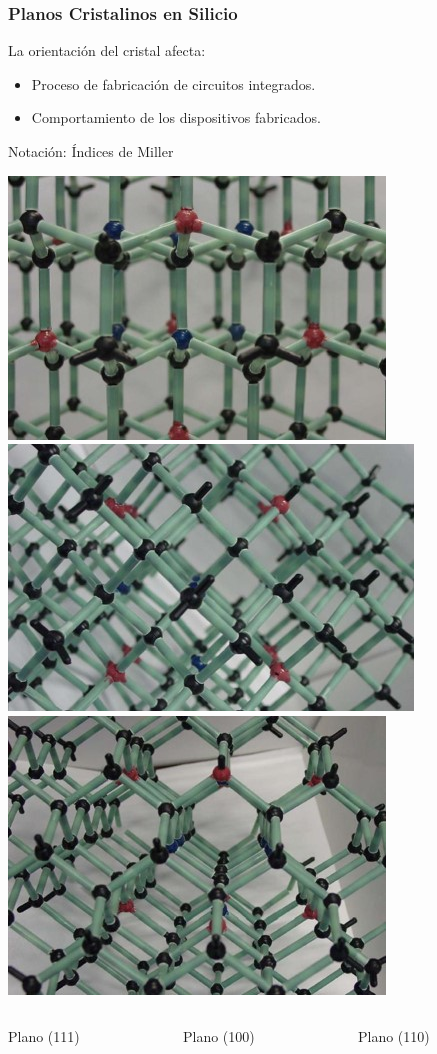 \documentclass[10pt,t,aspectratio=169]{beamer}
\begin{document}
\begin{frame}
  \frametitle{Planos Cristalinos en Silicio}
  
  La orientación del cristal afecta:

  \begin{itemize}
    \item Proceso de fabricación de circuitos integrados.
    \item Comportamiento de los dispositivos fabricados.
  \end{itemize}

  \vspace{3mm}
  Notación: Índices de Miller

  \vspace{5mm}
  \centering
  \includegraphics[height=0.2\textwidth]{./figures/silicon111.jpg}
  \includegraphics[height=0.2\textwidth]{./figures/silicon100.jpg}
  \includegraphics[height=0.2\textwidth]{./figures/silicon110.jpg}

  \begin{columns}
    \begin{column}[t]{3.5cm}
      \centering Plano (111)
    \end{column}
    \begin{column}[t]{3.5cm}
      \centering Plano (100)
    \end{column}
    \begin{column}[t]{3.5cm}
      \centering Plano (110)
    \end{column}
  \end{columns}
\end{frame}
\end{document}
